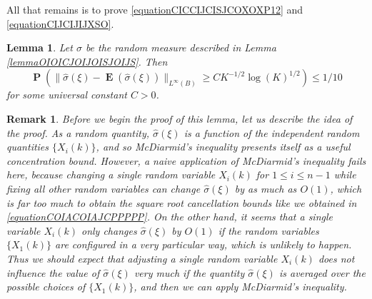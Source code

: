 \documentclass[dvipsnames,letterpaper,12pt]{article}
\numberwithin{equation}{section}
\newtheorem{lemma}[theorem]{Lemma}
\newtheorem{remark}[theorem]{Remark}
\numberwithin{theorem}{section}
\DeclareMathOperator{\EE}{\mathbf{E}}
\DeclareMathOperator{\PP}{\mathbf{P}}
\begin{document}
All that remains is to prove \eqref{equationCICCIJCISJCOXOXP12} and \eqref{equationCIJCIJIJXSO}.

\begin{lemma} \label{lemma24901401921209}
    Let $\sigma$ be the random measure described in Lemma \ref{lemmaOIOICJOIJOISJOIJS}. Then
    \[ \PP \left( \| \widehat{\sigma}(\xi) - \EE(\widehat{\sigma}(\xi)) \|_{L^\infty(B)} \geq C K^{-1/2} \log(K)^{1/2} \right) \leq 1/10 \]
    for some universal constant $C > 0$.
\end{lemma}

\begin{remark}
    Before we begin the proof of this lemma, let us describe the idea of the proof. As a random quantity, $\widehat{\sigma}(\xi)$ is a function of the independent random quantities $\{ X_i(k) \}$, and so McDiarmid's inequality presents itself as a useful concentration bound. However, a naive application of McDiarmid's inequality fails here, because changing a single random variable $X_i(k)$ for $1 \leq i \leq n-1$ while fixing all other random variables can change $\widehat{\sigma}(\xi)$ by as much as $O(1)$, which is far too much to obtain the square root cancellation bounds like we obtained in \eqref{equationCOIACOIAJCPPPPP}. On the other hand, it seems that a single variable $X_i(k)$ only changes $\widehat{\sigma}(\xi)$ by $O(1)$ if the random variables $\{ X_1(k) \}$ are configured in a very particular way, which is unlikely to happen. Thus we should expect that adjusting a single random variable $X_i(k)$ does not influence the value of $\widehat{\sigma}(\xi)$ very much if the quantity $\widehat{\sigma}(\xi)$ is \emph{averaged} over the possible choices of $\{ X_1(k) \}$, and then we can apply McDiarmid's inequality.
\end{remark}
\end{document}
